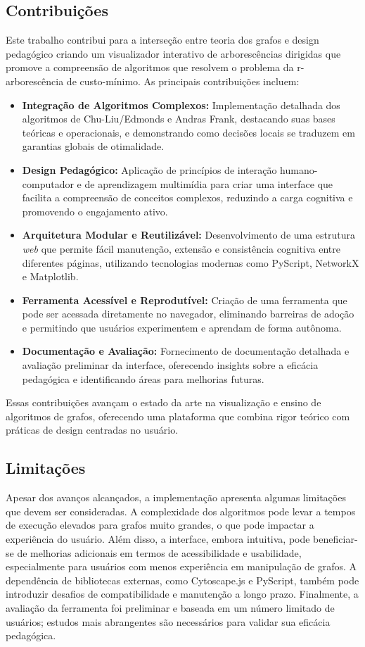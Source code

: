 \documentclass[12pt,a4paper]{article}
\begin{document}
\subsection{Contribuições}
Este trabalho contribui para a interseção entre teoria dos grafos e design pedagógico criando um visualizador interativo de arborescências dirigidas que promove a compreensão de algoritmos que resolvem o problema da r-arborescência de custo-mínimo. As principais contribuições incluem:
\begin{itemize}
    \item \textbf{Integração de Algoritmos Complexos:} Implementação detalhada dos algoritmos de Chu-Liu/Edmonds e Andras Frank, destacando suas bases teóricas e operacionais, e demonstrando como decisões locais se traduzem em garantias globais de otimalidade.
    \item \textbf{Design Pedagógico:} Aplicação de princípios de interação humano-computador e de aprendizagem multimídia para criar uma interface que facilita a compreensão de conceitos complexos, reduzindo a carga cognitiva e promovendo o engajamento ativo.
    \item \textbf{Arquitetura Modular e Reutilizável:} Desenvolvimento de uma estrutura \textit{web} que permite fácil manutenção, extensão e consistência cognitiva entre diferentes páginas, utilizando tecnologias modernas como PyScript, NetworkX e Matplotlib.
    \item \textbf{Ferramenta Acessível e Reprodutível:} Criação de uma ferramenta que pode ser acessada diretamente no navegador, eliminando barreiras de adoção e permitindo que usuários experimentem e aprendam de forma autônoma.
    \item \textbf{Documentação e Avaliação:} Fornecimento de documentação detalhada e avaliação preliminar da interface, oferecendo insights sobre a eficácia pedagógica e identificando áreas para melhorias futuras.
\end{itemize}
Essas contribuições avançam o estado da arte na visualização e ensino de algoritmos de grafos, oferecendo uma plataforma que combina rigor teórico com práticas de design centradas no usuário.

\subsection{Limitações}
Apesar dos avanços alcançados, a implementação apresenta algumas limitações que devem ser consideradas. A complexidade dos algoritmos pode levar a tempos de execução elevados para grafos muito grandes, o que pode impactar a experiência do usuário. Além disso, a interface, embora intuitiva, pode beneficiar-se de melhorias adicionais em termos de acessibilidade e usabilidade, especialmente para usuários com menos experiência em manipulação de grafos. A dependência de bibliotecas externas, como Cytoscape.js e PyScript, também pode introduzir desafios de compatibilidade e manutenção a longo prazo. Finalmente, a avaliação da ferramenta foi preliminar e baseada em um número limitado de usuários; estudos mais abrangentes são necessários para validar sua eficácia pedagógica.
\end{document}
